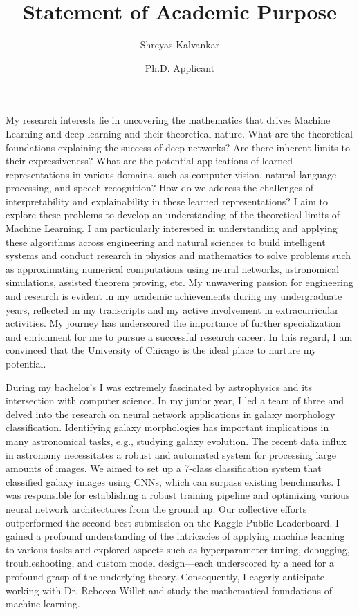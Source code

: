\documentclass{article}
\title{Statement of Academic Purpose}
\author{Shreyas Kalvankar}
\date{Ph.D. Applicant}
\begin{document}
  \maketitle%
  \thispagestyle{empty}

My research interests lie in uncovering the mathematics that drives Machine
Learning and deep learning and their theoretical nature. What are the
theoretical foundations explaining the success of deep networks? Are there
inherent limits to their expressiveness? What are the potential applications of
learned representations in various domains, such as computer vision, natural
language processing, and speech recognition? How do we address the challenges of
interpretability and explainability in these learned representations? I aim to
explore these problems to develop an understanding of the theoretical limits of
Machine Learning. I am particularly interested in understanding and applying
these algorithms across engineering and natural sciences to build intelligent
systems and conduct research in physics and mathematics to solve problems such
as approximating numerical computations using neural networks, astronomical
simulations, assisted theorem proving, etc. My unwavering passion for
engineering and research is evident in my academic achievements during my
undergraduate years, reflected in my transcripts and my active involvement in
extracurricular activities. My journey has underscored the importance of further
specialization and enrichment for me to pursue a successful research career. In
this regard, I am convinced that the University of Chicago is the ideal place to
nurture my potential.

During my bachelor’s I was extremely fascinated by astrophysics and its
intersection with computer science. In my junior year, I led a team of three and
delved into the research on neural network applications in galaxy morphology
classification. Identifying galaxy morphologies has important implications in
many astronomical tasks, e.g., studying galaxy evolution. The recent data influx
in astronomy necessitates a robust and automated system for processing large
amounts of images. We aimed to set up a 7-class classification system that
classified galaxy images using CNNs, which can surpass existing benchmarks. I
was responsible for establishing a robust training pipeline and optimizing
various neural network architectures from the ground up. Our collective efforts
outperformed the second-best submission on the Kaggle Public Leaderboard. I
gained a profound understanding of the intricacies of applying machine learning
to various tasks and explored aspects such as hyperparameter tuning, debugging,
troubleshooting, and custom model design—each underscored by a need for a
profound grasp of the underlying theory. Consequently, I eagerly anticipate
working with Dr. Rebecca Willet and study the mathematical foundations of
machine learning.
\end{document}
